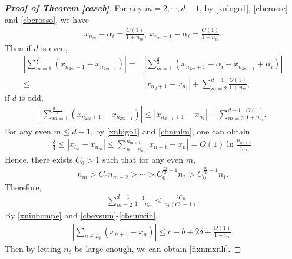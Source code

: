 \documentclass[12pt]{amsart}
\newcommand{\abs}[1]{\left\lvert #1 \right\rvert}
\theoremstyle{plain}
\theoremstyle{definition}
\begin{document}
\begin{proof}[\textbf{Proof of Theorem \ref{caseb}}]
For any $m=2,\cdots,d-1$, by \eqref{xnbigo1}, \eqref{cbcrosse} and \eqref{cbcrosso}, we have
\begin{align}
	x_{n_m}-\alpha_i=\frac{O(1)}{1+n_m},\ x_{n_m+1}-\alpha_i=\frac{O(1)}{1+n_m}.\nonumber
\end{align}
Then if $d$ is even, 
\begin{align}
	\abs{\sum_{m=1}^{\frac{d}{2}}(x_{n_{2m}+1}-x_{n_{2m-1}})}\nonumber=&\abs{\sum_{m=1}^{\frac{d}{2}}(x_{n_{2m}+1}-\alpha_i-x_{n_{2m-1}}+\alpha_i)}\\
	\leq &\abs{x_{n_d+1}-x_{n_1}}+\sum_{m=2}^{d-1}\frac{O(1)}{1+n_m},
\end{align}
if $d$ is odd,
\begin{align}
	\abs{\sum_{m=1}^{\frac{d-1}{2}}(x_{n_{2m}+1}-x_{n_{2m-1}})}\leq \abs{x_{n_{d-1}+1}-x_{n_1}}+\sum_{m=2}^{d-1}\frac{O(1)}{1+n_m}.
\end{align}
For any even $m\leq d-1$, by \eqref{xnbigo1} and \eqref{cbnmlm}, one can obtain
\begin{align}
	\frac{\delta}{4}\leq \abs{x_{l_m}-x_{n_m}}\leq \sum_{n=n_m}^{n_{m+1}}\abs{x_{n+1}-x_n}=O(1)\ln \frac{n_{m+1}}{n_m}.\nonumber
\end{align}
Hence, there exists $C_0>1$ such that for any even $m$,
\begin{align}
	n_m>C_0n_{m-2}>\cdots>C_0^{\frac{m}{2}-1}n_2>C_0^{\frac{m}{2}-1}n_1.\nonumber
\end{align}
Therefore,
\begin{align}
	\sum_{m=2}^{d-1}\frac{1}{1+n_m}\leq \frac{2C_0}{n_1(C_0-1)}.\label{cbsumfin}
\end{align}
By \eqref{xninbcmpe} and \eqref{cbevsum}-\eqref{cbsumfin}, 
\begin{align}
		\abs{\sum_{n\in L_i}(x_{n+1}-x_n)}\leq c-b+2\delta+\frac{O(1)}{1+n_1}.\nonumber
		\end{align}
Then by letting $n_\delta$ be large enough, we can obtain \eqref{fixnmxnli}.
\end{proof}
\end{document}
